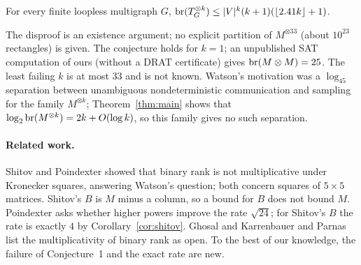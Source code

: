 \begin{corollary}\label{cor:graph}
For every finite loopless multigraph $G$, $\operatorname{br}(T_G^{\otimes k})\le|V|^k(k+1)(\lfloor2.41k\rfloor+1)$.
\end{corollary}

\begin{remark}
The disproof is an existence argument; no explicit partition of $M^{\otimes33}$ (about $10^{23}$ rectangles) is given. The conjecture holds for $k=1$; an unpublished SAT computation of ours (without a DRAT certificate) gives $\operatorname{br}(M\otimes M)=25$. The least failing $k$ is at most $33$ and is not known. Watson's motivation was a $\log_45$ separation between unambiguous nondeterministic communication and sampling for the family $M^{\otimes k}$; Theorem~\ref{thm:main} shows that $\log_2\operatorname{br}(M^{\otimes k})=2k+O(\log k)$, so this family gives no such separation.
\end{remark}

\paragraph{Related work.} Shitov \cite{Sh26} and Poindexter \cite{Po26} showed that binary rank is not multiplicative under Kronecker squares, answering Watson's question; both concern squares of $5\times5$ matrices. Shitov's $B$ is $M$ minus a column, so a bound for $B$ does not bound $M$. Poindexter asks whether higher powers improve the rate $\sqrt{24}$; for Shitov's $B$ the rate is exactly $4$ by Corollary~\ref{cor:shitov}. Ghosal and Karrenbauer \cite{GK25} and Parnas \cite{Pa26} list the multiplicativity of binary rank as open. To the best of our knowledge, the failure of Conjecture~1 and the exact rate are new.
